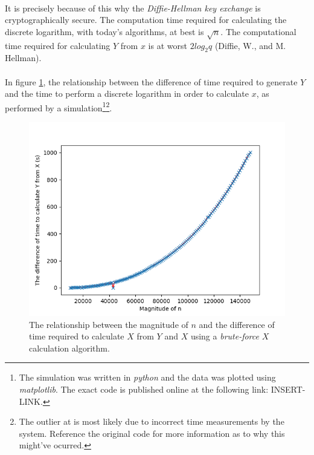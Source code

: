 \documentclass[a4paper, 12pt]{article}
\begin{document}
\paragraph*{}
It is precisely because of this why the \textit{Diffie-Hellman key exchange} is cryptographically secure. The 
computation time required for calculating the discrete logarithm, with today's algorithms, at best is $\sqrt{n}$.
The computational time required for calculating $Y$ from $x$ is at worst $2log_2 q$ (Diffie, W., and M. Hellman).

\paragraph*{}
In figure \ref{fig:n-xy-time}, the relationship between the difference of time required to generate $Y$ and the time 
to perform a discrete logarithm in order to calculate $x$, as performed by a simulation\footnote{The simulation was 
written in \textit{python} and the data was plotted using \textit{matplotlib}. The exact code is published online at 
the following link: INSERT-LINK.}\footnote{The outlier at is most likely due to incorrect time measurements by the 
system. Reference the original code for more information as to why this might've ocurred.}.
\begin{figure}[ht]
\includegraphics[width=12cm]{n_xy-time_relationship}
\centering
\caption{The relationship between the magnitude of $n$ and the difference of time required to calculate $X$ from $Y$ 
and $X$ using a \textit{brute-force} $X$ calculation algorithm.}
\label{fig:n-xy-time}
\end{figure}
\end{document}
